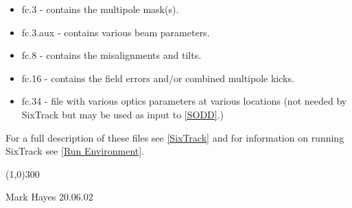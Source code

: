 \begin{itemize}
	\item  fc.3 - contains the multipole mask(s). 
	\item  fc.3.aux - contains various beam parameters. 
	\item  fc.8 - contains the misalignments and tilts. 
	\item  fc.16 - contains the field errors and/or combined multipole kicks. 
	\item  fc.34 - file with various optics parameters at various locations (not needed by SixTrack but may be used as input to \href{../Introduction/bibliography.html#SODD}{[SODD]}.) 
\end{itemize}  For a full description of these files see \href{../Introduction/bibliography.html#SixTrack}{[SixTrack]} and for information on running SixTrack see  \href{../Introduction/bibliography.html#SixTrack_Run_Environment}{[Run Environment]}. 

\line(1,0){300}

 Mark Hayes 20.06.02 
 

%

